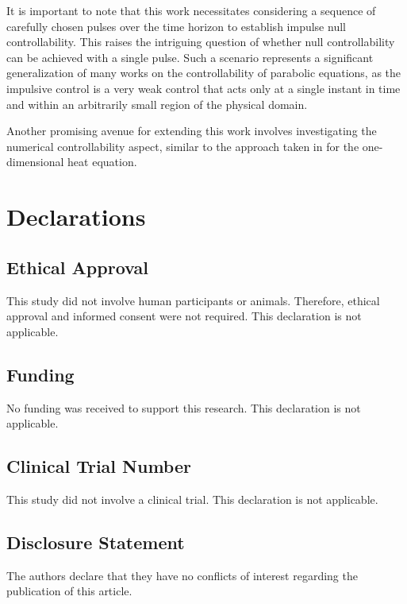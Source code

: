 \documentclass[sn-mathphys]{sn-jnl}
\begin{document}
It is important to note that this work necessitates considering a sequence of carefully chosen pulses over the time horizon to establish impulse null controllability. This raises the intriguing question of whether null controllability can be achieved with a single pulse. Such a scenario represents a significant generalization of many works on the controllability of parabolic equations, as the impulsive control is a very weak control that acts only at a single instant in time and within an arbitrarily small region of the physical domain.

Another promising avenue for extending this work involves investigating the numerical controllability aspect, similar to the approach taken in \cite{CGMZ'221} for the one-dimensional heat equation.

\section*{Declarations}

\subsection*{Ethical Approval}
This study did not involve human participants or animals. Therefore, ethical approval and informed consent were not required. This declaration is not applicable.

\subsection*{Funding}
No funding was received to support this research. This declaration is not applicable.

\subsection*{Clinical Trial Number}
This study did not involve a clinical trial. This declaration is not applicable.

\subsection*{Disclosure Statement}
The authors declare that they have no conflicts of interest regarding the publication of this article.









\end{document}
